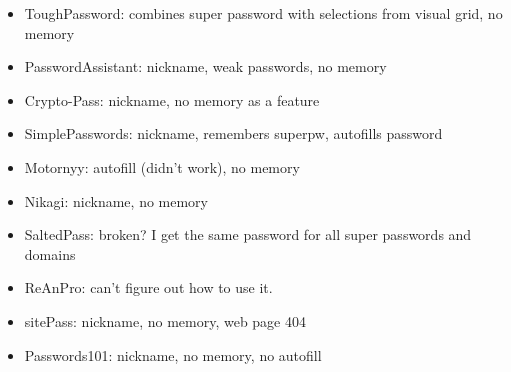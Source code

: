 \begin{itemize}

\item ToughPassword: combines super password with selections from visual grid, no memory


\item PasswordAssistant: nickname, weak passwords, no memory


\item Crypto-Pass: nickname, no memory as a feature


\item SimplePasswords: nickname, remembers superpw, autofills password


\item Motornyy: autofill (didn't work), no memory


\item Nikagi: nickname, no memory


\item SaltedPass:  broken? I get the same password for all super passwords and domains


\item ReAnPro: can't figure out how to use it.


\item sitePass: nickname, no memory, web page 404


\item Passwords101: nickname, no memory, no autofill


\end{itemize}
